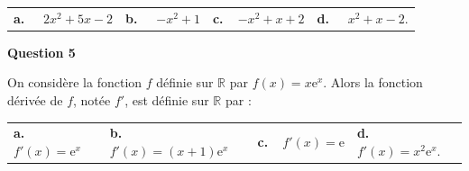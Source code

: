 \documentclass[10pt]{article}
\providecommand{\R}{\mathbb{R}}
\providecommand{\e}{{\mathrm{e}}}
\begin{document}
\medskip

\begin{tabularx}{\linewidth}{*{4}{X}}
\textbf{a.~~} $2x^2+5x-2 $ &\textbf{b.~~} $-x^2+1 $&\textbf{c.~~}$-x^2+x+2 $& \textbf{d.~~} $x^2+x-2  $.
\end{tabularx}

\medskip

\textbf{Question 5}

\medskip 

On considère la fonction $f$ définie sur $\R$ par $f(x)= x\e^x$.
Alors la fonction dérivée de $f$, notée $f'$, est définie sur $\R$ par :

\medskip

\begin{tabularx}{\linewidth}{*{4}{X}}
\textbf{a.~~} $ f'(x)= \e^x$ &\textbf{b.~~} $f'(x)=(x+1)\e^x$&\textbf{c.~~}$f'(x)=\e $& \textbf{d.~~} $f'(x)=   x^2\e^x   $.
\end{tabularx}

\vspace{0,5cm}
\end{document}
